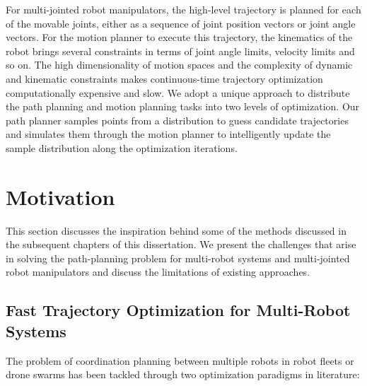 \begin{enumerate}
    For multi-jointed robot manipulators, the high-level trajectory is planned for each of the movable joints, either as a sequence of joint position vectors or joint angle vectors. For the motion planner to execute this trajectory, the kinematics of the robot brings several constraints in terms of joint angle limits, velocity limits and so on. The high dimensionality of motion spaces and the complexity of dynamic and kinematic constraints makes continuous-time trajectory optimization computationally expensive and slow. We adopt a unique approach to distribute the path planning and motion planning tasks into two levels of optimization. Our path planner samples points from a distribution to guess candidate trajectories and simulates them through the motion planner to intelligently update the sample distribution along the optimization iterations. 

\end{enumerate}

\section{Motivation}

This section discusses the inspiration behind some of the methods discussed in the subsequent chapters of this dissertation. We present the challenges that arise in solving the path-planning problem for multi-robot systems and multi-jointed robot manipulators and discuss the limitations of existing approaches.

\subsection{Fast Trajectory Optimization for Multi-Robot Systems}\label{centralized_vs_distributed}

The problem of coordination planning between multiple robots in robot fleets or drone swarms has been tackled through two optimization paradigms in literature:


